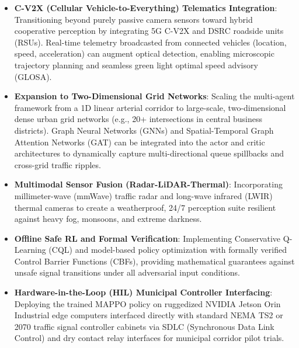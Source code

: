 \begin{itemize}
    \item \textbf{C-V2X (Cellular Vehicle-to-Everything) Telematics Integration}: Transitioning beyond purely passive camera sensors toward hybrid cooperative perception by integrating 5G C-V2X and DSRC roadside units (RSUs). Real-time telemetry broadcasted from connected vehicles (location, speed, acceleration) can augment optical detection, enabling microscopic trajectory planning and seamless green light optimal speed advisory (GLOSA).
    
    \item \textbf{Expansion to Two-Dimensional Grid Networks}: Scaling the multi-agent framework from a 1D linear arterial corridor to large-scale, two-dimensional dense urban grid networks (e.g., 20+ intersections in central business districts). Graph Neural Networks (GNNs) and Spatial-Temporal Graph Attention Networks (GAT) can be integrated into the actor and critic architectures to dynamically capture multi-directional queue spillbacks and cross-grid traffic ripples.
    
    \item \textbf{Multimodal Sensor Fusion (Radar-LiDAR-Thermal)}: Incorporating millimeter-wave (mmWave) traffic radar and long-wave infrared (LWIR) thermal cameras to create a weatherproof, 24/7 perception suite resilient against heavy fog, monsoons, and extreme darkness.
    
    \item \textbf{Offline Safe RL and Formal Verification}: Implementing Conservative Q-Learning (CQL) and model-based policy optimization with formally verified Control Barrier Functions (CBFs), providing mathematical guarantees against unsafe signal transitions under all adversarial input conditions.
    
    \item \textbf{Hardware-in-the-Loop (HIL) Municipal Controller Interfacing}: Deploying the trained MAPPO policy on ruggedized NVIDIA Jetson Orin Industrial edge computers interfaced directly with standard NEMA TS2 or 2070 traffic signal controller cabinets via SDLC (Synchronous Data Link Control) and dry contact relay interfaces for municipal corridor pilot trials.
\end{itemize}
